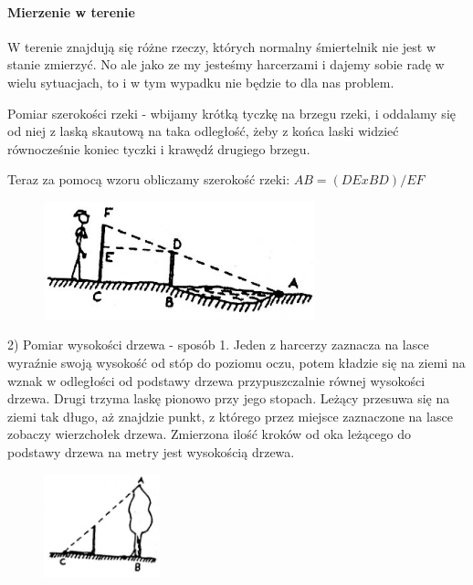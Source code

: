 \paragraph{Mierzenie w terenie}

W terenie znajdują się różne rzeczy, których normalny śmiertelnik nie jest w stanie zmierzyć. No ale jako ze my jesteśmy harcerzami i dajemy sobie radę w wielu sytuacjach, to i w tym wypadku nie będzie to dla nas problem.

Pomiar szerokości rzeki - wbijamy krótką tyczkę na brzegu rzeki, i oddalamy się od niej z laską skautową na taka odległość, żeby z końca laski widzieć równocześnie koniec tyczki i krawędź drugiego brzegu.

Teraz za pomocą wzoru obliczamy szerokość rzeki: $AB= (DE x BD)/EF$
\begin{figure}[h]
\begin{center}
\includegraphics[width=0.7\textwidth]{grafiki/rzeka.png}
\end{center}
\end{figure}

2) Pomiar wysokości drzewa - sposób 1. 
Jeden z harcerzy zaznacza na lasce wyraźnie swoją wysokość od stóp do poziomu oczu, potem kładzie się na ziemi na wznak w odległości od podstawy drzewa przypuszczalnie równej wysokości drzewa. 
Drugi trzyma laskę pionowo przy jego stopach. 
Leżący przesuwa się na ziemi tak długo, aż znajdzie punkt, z którego przez miejsce zaznaczone na lasce zobaczy wierzchołek drzewa. 
Zmierzona ilość kroków od oka leżącego do podstawy drzewa na metry jest wysokością drzewa.
\begin{figure}[h]
\begin{center}
\includegraphics[width=0.3\textwidth]{grafiki/pomiardrzewa.png}
\end{center}
\end{figure}

